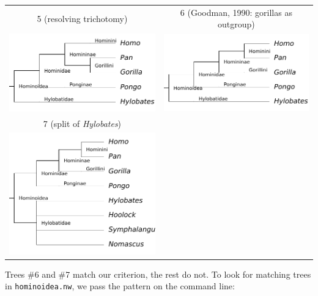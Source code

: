 \begin{tabular}{cc}
5 (resolving trichotomy) & 6 (Goodman, 1990: gorillas as outgroup) \\
\includegraphics[scale=0.7]{homino_4.pdf} & \includegraphics[scale=0.7]{homino_5.pdf} \\
7 (split of \emph{Hylobates}) \\
\includegraphics[scale=0.7]{homino_6.pdf} & 
\end{tabular}

\noindent{}Trees \#6 and \#7 match our criterion, the rest do not. To look for matching trees in \texttt{hominoidea.nw}, we pass the pattern on the command line:



